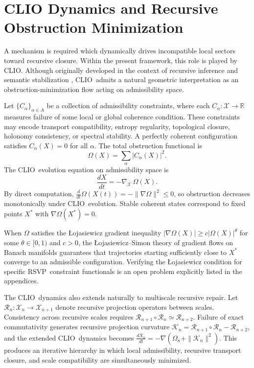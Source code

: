 \documentclass[12pt,a4paper]{article}
\newcommand{\RSVP}{\textrm{RSVP}}
\newcommand{\CLIO}{\textrm{CLIO}}
\newcommand{\Field}{\mathcal{X}}
\newcommand{\R}{\mathbb{R}}
\begin{document}
\section{CLIO Dynamics and Recursive Obstruction Minimization}

A mechanism is required which dynamically drives incompatible local sectors
toward recursive closure. Within the present framework, this role is played by
\CLIO. Although originally developed in the context of recursive inference and
semantic stabilization \cite{Cheng2025}, \CLIO\ admits a natural geometric
interpretation as an obstruction-minimization flow acting on admissibility
space.

Let $\{C_\alpha\}_{\alpha\in A}$ be a collection of admissibility constraints,
where each $C_\alpha:\Field\to\R$ measures failure of some local or global
coherence condition. These constraints may encode transport compatibility,
entropy regularity, topological closure, holonomy consistency, or spectral
stability. A perfectly coherent configuration satisfies $C_\alpha(X)=0$ for all
$\alpha$. The total obstruction functional is
\[
\Omega(X) = \sum_\alpha |C_\alpha(X)|^2.
\]
The \CLIO\ evolution equation on admissibility space is
\[
\frac{dX}{dt} = -\nabla_\Field\,\Omega(X).
\]
By direct computation,
$\frac{d}{dt}\Omega(X(t))=-\|\nabla\Omega\|^2\leq 0$,
so obstruction decreases monotonically under \CLIO\ evolution. Stable coherent
states correspond to fixed points $X^\ast$ with $\nabla\Omega(X^\ast)=0$.

When $\Omega$ satisfies the Łojasiewicz gradient inequality
$|\nabla\Omega(X)|\geq c|\Omega(X)|^\theta$ for some $\theta\in[0,1)$ and
$c>0$, the Łojasiewicz--Simon theory of gradient flows on Banach manifolds
\cite{Lojasiewicz1963,Simon1983} guarantees that trajectories starting
sufficiently close to $X^\ast$ converge to an admissible configuration.
Verifying the Łojasiewicz condition for specific \RSVP\ constraint functionals
is an open problem explicitly listed in the appendices.

The \CLIO\ dynamics also extends naturally to multiscale recursive repair.
Let $\mathcal{R}_n:\Field_n\to\Field_{n+1}$ denote recursive projection
operators between scales. Consistency across recursive scales requires
$\mathcal{R}_{n+1}\circ\mathcal{R}_n\simeq\mathcal{R}_{n+2}$. Failure of exact
commutativity generates recursive projection curvature
$\mathcal{K}_n=\mathcal{R}_{n+1}\circ\mathcal{R}_n-\mathcal{R}_{n+2}$, and the
extended \CLIO\ dynamics becomes
$\frac{dX_n}{dt}=-\nabla(\Omega_n+\|\mathcal{K}_n\|^2)$.
This produces an iterative hierarchy in which local admissibility, recursive
transport closure, and scale compatibility are simultaneously minimized.
\end{document}
